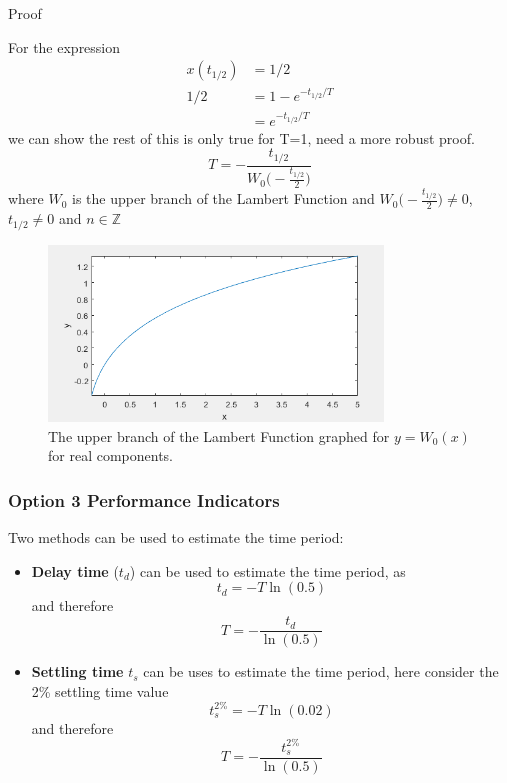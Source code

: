 \documentclass[12pt,letter]{article}
\numberwithin{ex}{section} %
\numberwithin{re}{section} %
\newcommand{\gr}[1]{\textcolor[rgb]{0.00,0.50,0.00}{#1}}
\newcommand{\rd}[1]{\textcolor[rgb]{0.75,0.00,0.00}{#1}}
\numberwithin{equation}{section}	%
\begin{document}
\begin{itemize}
\begin{itemize}
\begin{mdframed}[middlelinewidth=0.5mm]
	\begin{center}
		\gr{Proof}
	\end{center}
For the expression
\begin{align}
x(t_{1/2}) &= 1/2 \\
1/2 &= 1-e^{-t_{1/2}/T} \nonumber \\
&= e^{-t_{1/2}/T} \nonumber
\end{align}
we can show \rd{the rest of this is only true for T=1, need a more robust proof.}
\begin{equation}
T=-\frac{t_{1/2}}{W_0 \big(-\frac{t_{1/2}}{2}\big)}
\end{equation}
where $W_0$ is the upper branch of the Lambert Function and $W_0\big(-\frac{t_{1/2}}{2}\big) \neq 0$, $t_{1/2} \neq 0 $ and $n \in \mathbb{Z} $
\begin{figure}[H]
    \centering
    \includegraphics[width=3.5in]{../Figures/Lambert_function}
	\caption{The upper branch of the Lambert Function graphed for $y = W_0(x)$ for real components. }
\end{figure}

\end{mdframed}




\end{itemize}
\end{itemize}

\subsubsection{Option 3 Performance Indicators}
 
Two methods can be used to estimate the time period:
\begin{itemize}
\item \textbf{Delay time} ($t_d$) can be used to estimate the time period, as 
\begin{equation}
t_d = -T \ln(0.5)
\end{equation}
and therefore
\begin{equation}
T = - \frac{t_d}{\ln(0.5)}
\end{equation}
\item \textbf{Settling time} $t_s$ can be uses to estimate the time period, here consider the 2\% settling time value 
\begin{equation}
t_s^{2\%} = -T \ln(0.02)
\end{equation}
and therefore
\begin{equation}
T = - \frac{t_s^{2\%}}{\ln(0.5)}
\end{equation}
\end{itemize}
\end{document}
